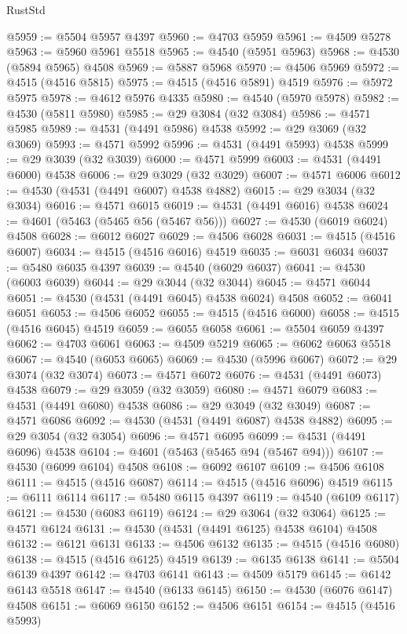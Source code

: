\begin{lexlean}{RustStd}
\begin{coremodule}
@5959 := @5504 @5957 @4397
@5960 := @4703 @5959
@5961 := @4509 @5278
@5963 := @5960 @5961 @5518
@5965 := @4540 (@5951 @5963)
@5968 := @4530 (@5894 @5965) @4508
@5969 := @5887 @5968
@5970 := @4506 @5969
@5972 := @4515 (@4516 @5815)
@5975 := @4515 (@4516 @5891) @4519
@5976 := @5972 @5975
@5978 := @4612 @5976 @4335
@5980 := @4540 (@5970 @5978)
@5982 := @4530 (@5811 @5980)
@5985 := @29 @3084 (@32 @3084)
@5986 := @4571 @5985
@5989 := @4531 (@4491 @5986) @4538
@5992 := @29 @3069 (@32 @3069)
@5993 := @4571 @5992
@5996 := @4531 (@4491 @5993) @4538
@5999 := @29 @3039 (@32 @3039)
@6000 := @4571 @5999
@6003 := @4531 (@4491 @6000) @4538
@6006 := @29 @3029 (@32 @3029)
@6007 := @4571 @6006
@6012 := @4530 (@4531 (@4491 @6007) @4538 @4882)
@6015 := @29 @3034 (@32 @3034)
@6016 := @4571 @6015
@6019 := @4531 (@4491 @6016) @4538
@6024 := @4601 (@5463 (@5465 @56 (@5467 @56)))
@6027 := @4530 (@6019 @6024) @4508
@6028 := @6012 @6027
@6029 := @4506 @6028
@6031 := @4515 (@4516 @6007)
@6034 := @4515 (@4516 @6016) @4519
@6035 := @6031 @6034
@6037 := @5480 @6035 @4397
@6039 := @4540 (@6029 @6037)
@6041 := @4530 (@6003 @6039)
@6044 := @29 @3044 (@32 @3044)
@6045 := @4571 @6044
@6051 := @4530 (@4531 (@4491 @6045) @4538 @6024) @4508
@6052 := @6041 @6051
@6053 := @4506 @6052
@6055 := @4515 (@4516 @6000)
@6058 := @4515 (@4516 @6045) @4519
@6059 := @6055 @6058
@6061 := @5504 @6059 @4397
@6062 := @4703 @6061
@6063 := @4509 @5219
@6065 := @6062 @6063 @5518
@6067 := @4540 (@6053 @6065)
@6069 := @4530 (@5996 @6067)
@6072 := @29 @3074 (@32 @3074)
@6073 := @4571 @6072
@6076 := @4531 (@4491 @6073) @4538
@6079 := @29 @3059 (@32 @3059)
@6080 := @4571 @6079
@6083 := @4531 (@4491 @6080) @4538
@6086 := @29 @3049 (@32 @3049)
@6087 := @4571 @6086
@6092 := @4530 (@4531 (@4491 @6087) @4538 @4882)
@6095 := @29 @3054 (@32 @3054)
@6096 := @4571 @6095
@6099 := @4531 (@4491 @6096) @4538
@6104 := @4601 (@5463 (@5465 @94 (@5467 @94)))
@6107 := @4530 (@6099 @6104) @4508
@6108 := @6092 @6107
@6109 := @4506 @6108
@6111 := @4515 (@4516 @6087)
@6114 := @4515 (@4516 @6096) @4519
@6115 := @6111 @6114
@6117 := @5480 @6115 @4397
@6119 := @4540 (@6109 @6117)
@6121 := @4530 (@6083 @6119)
@6124 := @29 @3064 (@32 @3064)
@6125 := @4571 @6124
@6131 := @4530 (@4531 (@4491 @6125) @4538 @6104) @4508
@6132 := @6121 @6131
@6133 := @4506 @6132
@6135 := @4515 (@4516 @6080)
@6138 := @4515 (@4516 @6125) @4519
@6139 := @6135 @6138
@6141 := @5504 @6139 @4397
@6142 := @4703 @6141
@6143 := @4509 @5179
@6145 := @6142 @6143 @5518
@6147 := @4540 (@6133 @6145)
@6150 := @4530 (@6076 @6147) @4508
@6151 := @6069 @6150
@6152 := @4506 @6151
@6154 := @4515 (@4516 @5993)

\end{coremodule}
\end{lexlean}
